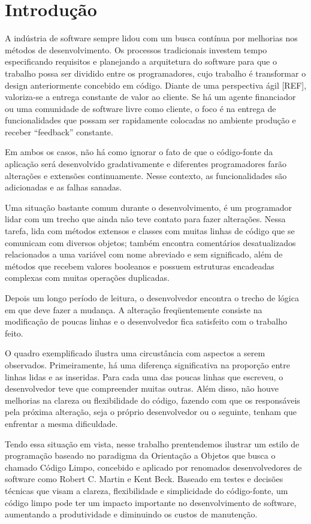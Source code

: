 \chapter{Introdução}
\label{chap:introducao}

A indústria de software sempre lidou com um busca contínua por melhorias nos métodos
de desenvolvimento. Os processos tradicionais investem tempo especificando requisitos
e planejando a arquitetura do software para que o trabalho possa ser dividido entre os
programadores, cujo trabalho é transformar o design anteriormente concebido em código.
Diante de uma perspectiva ágil [REF], valoriza-se a entrega constante 
de valor ao cliente. Se há um agente financiador ou uma comunidade de software livre
como cliente, o foco é na entrega de funcionalidades que possam ser rapidamente colocadas
no ambiente produção e receber ``feedback'' constante.

Em ambos os casos, não há como ignorar o fato de que o código-fonte da aplicação será
desenvolvido gradativamente e diferentes programadores farão alterações e extensões
continuamente. Nesse contexto, as funcionalidades são adicionadas e as falhas sanadas.

Uma situação bastante comum durante o desenvolvimento, é um programador lidar com um trecho que
ainda não teve contato para fazer alterações. Nessa tarefa, lida com métodos extensos e classes
com muitas linhas de código que se comunicam com diversos objetos; também encontra comentários
desatualizados relacionados a uma variável com nome abreviado e sem significado, além de métodos que 
recebem valores booleanos e possuem estruturas encadeadas complexas com muitas operações duplicadas.

Depois um longo período de leitura, o desenvolvedor encontra o trecho de lógica em que deve 
fazer a mudança. A alteração freqüentemente consiste na modificação de poucas linhas e o 
desenvolvedor fica satisfeito com o trabalho feito.

O quadro exemplificado ilustra uma circustância com aspectos a serem observados.
Primeiramente, há uma diferença significativa na proporção entre linhas lidas e as inseridas.
Para cada uma das poucas linhas que escreveu, o desenvolvedor teve que compreender muitas
outras. Além disso, não houve melhorias na clareza ou flexibilidade do código, fazendo 
com que os responsáveis pela próxima alteração, seja o próprio desenvolvedor ou o seguinte,
tenham que enfrentar a mesma dificuldade.

Tendo essa situação em vista, nesse trabalho prentendemos ilustrar um estilo de programação baseado
no paradigma da Orientação a Objetos que busca o chamado Código Limpo, concebido e aplicado por renomados desenvolvedores de software
como Robert C. Martin e Kent Beck. Baseado em testes e decisões técnicas que visam a clareza, flexibilidade
e simplicidade do código-fonte, um código limpo pode ter um impacto importante no desenvolvimento 
de software, aumentando a produtividade e diminuindo os custos de manutenção.


